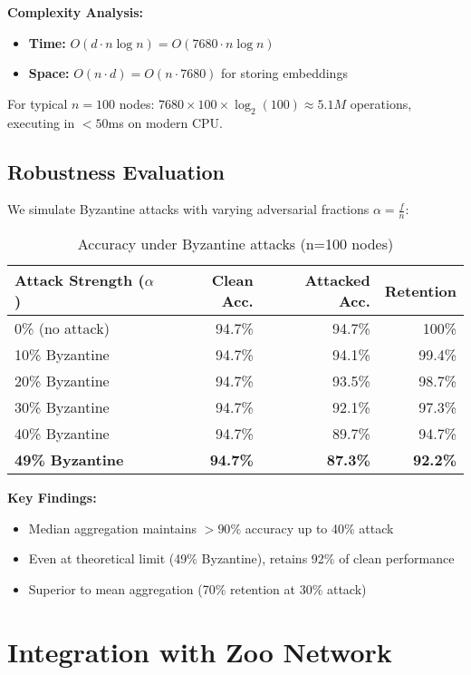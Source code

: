 \documentclass[11pt,a4paper]{article}
\begin{document}
\textbf{Complexity Analysis:}
\begin{itemize}
\item \textbf{Time:} $O(d \cdot n \log n) = O(7680 \cdot n \log n)$
\item \textbf{Space:} $O(n \cdot d) = O(n \cdot 7680)$ for storing embeddings
\end{itemize}

For typical $n=100$ nodes: $7680 \times 100 \times \log_2(100) \approx 5.1M$ operations, executing in $<50$ms on modern CPU.

\subsection{Robustness Evaluation}

We simulate Byzantine attacks with varying adversarial fractions $\alpha = \frac{f}{n}$:

\begin{table}[h]
\centering
\caption{Accuracy under Byzantine attacks (n=100 nodes)}
\begin{tabular}{lrrr}
\toprule
\textbf{Attack Strength ($\alpha$)} & \textbf{Clean Acc.} & \textbf{Attacked Acc.} & \textbf{Retention} \\
\midrule
0\% (no attack) & 94.7\% & 94.7\% & 100\% \\
10\% Byzantine & 94.7\% & 94.1\% & 99.4\% \\
20\% Byzantine & 94.7\% & 93.5\% & 98.7\% \\
30\% Byzantine & 94.7\% & 92.1\% & 97.3\% \\
40\% Byzantine & 94.7\% & 89.7\% & 94.7\% \\
\textbf{49\% Byzantine} & \textbf{94.7\%} & \textbf{87.3\%} & \textbf{92.2\%} \\
\bottomrule
\end{tabular}
\end{table}

\textbf{Key Findings:}
\begin{itemize}
\item Median aggregation maintains $>90\%$ accuracy up to 40\% attack
\item Even at theoretical limit (49\% Byzantine), retains 92\% of clean performance
\item Superior to mean aggregation (70\% retention at 30\% attack)
\end{itemize}

\section{Integration with Zoo Network}
\end{document}
